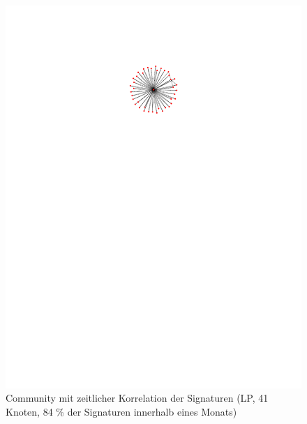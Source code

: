 \begin{figure}[h]
  \centering
  \includegraphics[scale=1.3]{images/label-subgraph-41-star-c222345bc5eb1f9eff80d58a81861974.pdf}
    \caption{Community mit zeitlicher Korrelation der Signaturen (LP,
      41 Knoten, 84 \% der Signaturen innerhalb eines Monats)}
  \label{fig:time-corr-com-star}
\end{figure}


